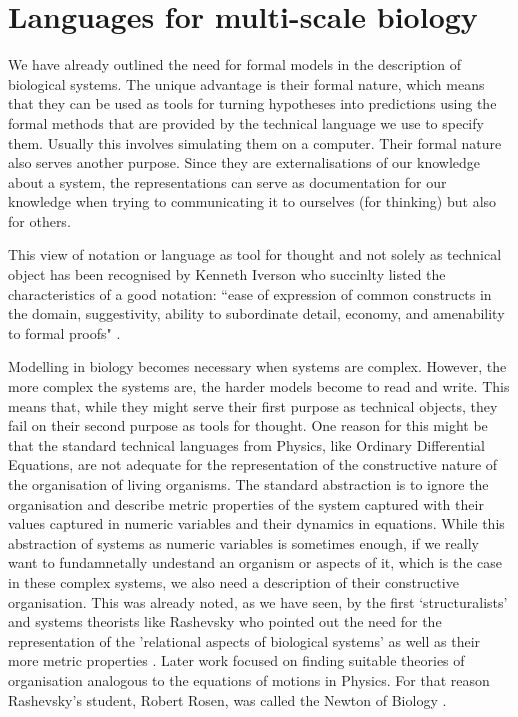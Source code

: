 

\section{Languages for multi-scale biology}
We have already outlined the need for formal models in the description of
biological systems. The unique advantage is their formal nature, which means
that they can be used as tools for turning hypotheses into predictions using the
formal methods that are provided by the technical language we use to specify
them. Usually this involves simulating them on a computer. Their formal nature
also serves another purpose. Since they are externalisations of our knowledge
about a system, the representations can serve as documentation for our knowledge
when trying to communicating it to ourselves (for thinking) but also for others.

This view of notation or language as tool for thought and not solely as
technical object has been recognised by Kenneth Iverson who succinlty listed the
characteristics of a good notation: ``ease of expression of common constructs
in the domain, suggestivity, ability to subordinate detail, economy, and
amenability to formal proofs" \cite{iverson2007notation}.

Modelling in biology becomes necessary when systems are complex. However, the
more complex the systems are, the harder models become to read and write. This
means that, while they might serve their first purpose as technical objects,
they fail on their second purpose as tools for thought. One reason for this
might be that the standard technical languages from Physics, like Ordinary
Differential Equations, are not adequate for the representation of the
constructive nature of the organisation of living organisms. The standard
abstraction is to ignore the organisation and describe metric properties of the
system captured with their values captured in numeric variables and their
dynamics in equations. While this abstraction of systems as numeric variables is
sometimes enough, if we really want to fundamnetally undestand an organism or
aspects of it, which is the case in these complex systems, we also need a
description of their constructive organisation. This was already noted, as we
have seen, by the first `structuralists' and systems theorists like Rashevsky
who pointed out the need for the representation of the 'relational aspects of
biological systems' as well as their more metric properties
\citet{rashevsky_topology_1954}. Later work focused on finding suitable theories
of organisation analogous to the equations of motions in Physics. For that
reason Rashevsky's student, Robert Rosen, was called the Newton of Biology
\citep{mikulecky2001robert}.

